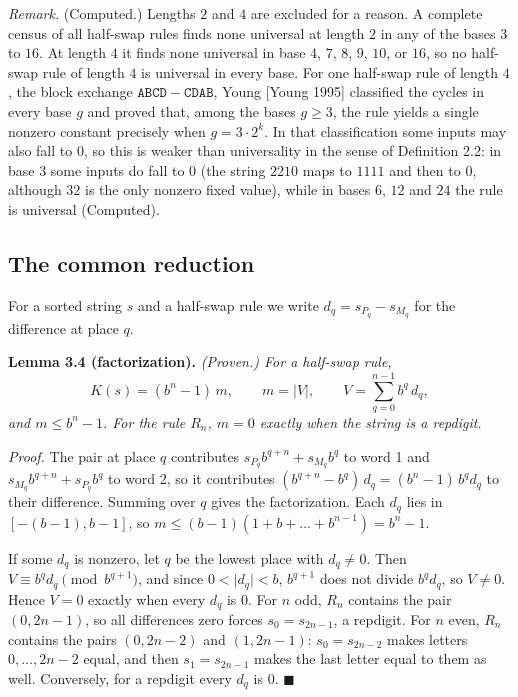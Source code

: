 \documentclass[11pt,letterpaper]{article}
\theoremstyle{paperstyle}
\theoremstyle{paperstyledef}
\theoremstyle{paperstylerem}
\begin{document}
\emph{Remark.} (Computed.) Lengths \(2\) and \(4\) are excluded for a reason. A complete census of all half-swap rules finds none universal at length \(2\) in any of the bases \(3\) to \(16\). At length \(4\) it finds none universal in base \(4\), \(7\), \(8\), \(9\), \(10\), or \(16\), so no half-swap rule of length \(4\) is universal in every base. For one half-swap rule of length \(4\), the block exchange \(\mathtt{ABCD} - \mathtt{CDAB}\), Young {[}Young 1995{]} classified the cycles in every base \(g\) and proved that, among the bases \(g \geq 3\), the rule yields a single nonzero constant precisely when \(g = 3 \cdot 2^k\). In that classification some inputs may also fall to \(0\), so this is weaker than universality in the sense of Definition 2.2: in base \(3\) some inputs do fall to \(0\) (the string \(2210\) maps to \(1111\) and then to \(0\), although \(32\) is the only nonzero fixed value), while in bases \(6\), \(12\) and \(24\) the rule is universal (Computed).

\subsection{The common reduction}\label{the-common-reduction}

For a sorted string \(s\) and a half-swap rule we write \(d_q = s_{P_q} - s_{M_q}\) for the difference at place \(q\).

\textbf{Lemma 3.4 (factorization).} \emph{(Proven.) For a half-swap rule,} \[K(s) = (b^n - 1)\, m, \qquad m = \lvert V \rvert, \qquad V = \sum_{q=0}^{n-1} b^q\, d_q,\] \emph{and \(m \leq b^n - 1\). For the rule \(R_n\), \(m = 0\) exactly when the string is a repdigit.}

\emph{Proof.} The pair at place \(q\) contributes \(s_{P_q} b^{q+n} + s_{M_q} b^q\) to word 1 and \(s_{M_q} b^{q+n} + s_{P_q} b^q\) to word 2, so it contributes \((b^{q+n} - b^q)\, d_q = (b^n - 1)\, b^q d_q\) to their difference. Summing over \(q\) gives the factorization. Each \(d_q\) lies in \([-(b-1), b-1]\), so \(m \leq (b-1)(1 + b + \dots + b^{n-1}) = b^n - 1\).

If some \(d_q\) is nonzero, let \(q\) be the lowest place with \(d_q \neq 0\). Then \(V \equiv b^q d_q \pmod{b^{q+1}}\), and since \(0 < \lvert d_q \rvert < b\), \(b^{q+1}\) does not divide \(b^q d_q\), so \(V \neq 0\). Hence \(V = 0\) exactly when every \(d_q\) is \(0\). For \(n\) odd, \(R_n\) contains the pair \((0, 2n-1)\), so all differences zero forces \(s_0 = s_{2n-1}\), a repdigit. For \(n\) even, \(R_n\) contains the pairs \((0, 2n-2)\) and \((1, 2n-1)\): \(s_0 = s_{2n-2}\) makes letters \(0, \dots, 2n-2\) equal, and then \(s_1 = s_{2n-1}\) makes the last letter equal to them as well. Conversely, for a repdigit every \(d_q\) is \(0\). \(\blacksquare\)
\end{document}
